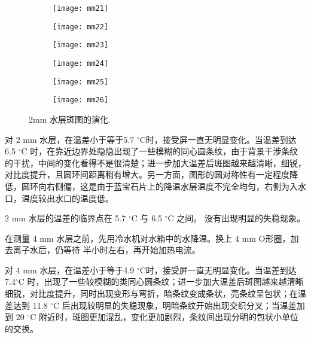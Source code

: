 \documentclass[aps,pre,12pt,preprint,onecolumn,showpacs,showkeys]{revtex4-1}
\def \degC {^\circ \mathrm{C}}
\begin{document}
	\begin{figure}[h]
	\centering
		\begin{subfigure}[t]{45mm}
			\centering
			\texttt{[image: mm21]}
			\caption{}\label{fig:2mma}
		\end{subfigure}
		\begin{subfigure}[t]{45mm}
			\centering
			\texttt{[image: mm22]}
			\caption{}\label{fig:2mmb}
		\end{subfigure}
		\begin{subfigure}[t]{45mm}
			\centering
			\texttt{[image: mm23]}
			\caption{}\label{fig:2mmc}
		\end{subfigure}
		\begin{subfigure}[t]{45mm}
			\centering
			\texttt{[image: mm24]}
			\caption{}\label{fig:2mmd}
		\end{subfigure}
		\begin{subfigure}[t]{45mm}
			\centering
			\texttt{[image: mm25]}
			\caption{}\label{fig:2mme}
		\end{subfigure}
		\begin{subfigure}[t]{45mm}
			\centering
			\texttt{[image: mm26]}
			\caption{}\label{fig:2mmf}
		\end{subfigure}
		\caption{2mm 水层斑图的演化.%
		}\label{fig:2mm}
	\end{figure}
	
	对 2 mm 水层，在温差小于等于5.7 $\degC$时，接受屏一直无明显变化。当温差到达 6.5 $\degC$ 时，在靠近边界处隐隐出现了一些模糊的同心圆条纹，由于背景干涉条纹的干扰，中间的变化看得不是很清楚；进一步加大温差后斑图越来越清晰，细锐，对比度提升，且圆环间距离稍有增大。另一方面，图形的圆对称性有一定程度降低，圆环向右侧偏，这是由于蓝宝石片上的降温水层温度不完全均匀，右侧为入水口，温度较出水口的温度低。
	
	2 mm 水层的温差的临界点在 5.7 $\degC$ 与 6.5 $\degC$ 之间。 没有出现明显的失稳现象。
	
	在测量 4 mm 水层之前，先用冷水机对水箱中的水降温。换上 4 mm O形圈，加去离子水后，仍等待 半小时左右，再开始加热电流。
	
	对 4 mm 水层，在温差小于等于4.9 $\degC$时，接受屏一直无明显变化。当温差到达 7.4$\degC$ 时，出现了一些较模糊的类同心圆条纹；进一步加大温差后斑图越来越清晰细锐，对比度提升，同时出现变形与弯折，暗条纹变成条状，亮条纹呈包状；在温差达到 11.8 $\degC$ 后出现较明显的失稳现象，明暗条纹开始出现交织分叉；当温差加到 20 $\degC$ 附近时，斑图更加混乱，变化更加剧烈，条纹间出现分明的包状小单位的交换。
	
\end{document}
